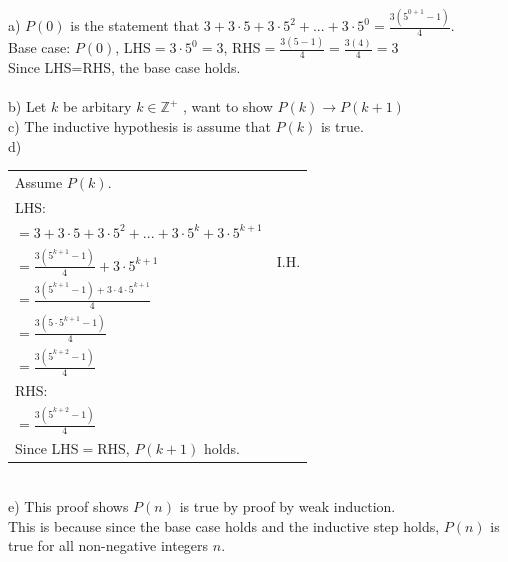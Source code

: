 \documentclass[12pt]{exam}
\begin{document}
\begin{solution}
	a) $P(0)$ is the statement that $3 + 3 \cdot 5 + 3 \cdot 5^2 + ... + 3 \cdot 5^0 = \frac{3 (5^{0+1} - 1)}{4}$.\\
	Base case: $P(0)$, LHS$=3 \cdot 5^0=3$, RHS$=\frac{3(5-1)}{4}=\frac{3(4)}{4}=3$\\
	Since LHS=RHS, the base case holds.\\
	\\ b) Let $k$ be arbitary $ k \in \mathbb{Z}^+$ , want to show $P(k) \rightarrow P(k+1)$\\
	c) The inductive hypothesis is assume that $P(k)$ is true.\\
	d)\\
	\begin{tabular}{ll}
		Assume $P(k)$.                                                       \\
		LHS:                                                                 \\
		$=3 + 3 \cdot 5 + 3 \cdot 5^2 + ... +3 \cdot 5^{k}+ 3 \cdot 5^{k+1}$ \\
		$=\frac{3 (5^{k+1} - 1)}{4}+3 \cdot 5^{k+1}$ & I.H.                  \\
		$=\frac{3(5^{k+1}-1)+ 3 \cdot 4 \cdot 5^{k+1}}{4}$                   \\
		$=\frac{3(5\cdot 5^{k+1}-1)}{4}$                                     \\
		$=\frac{3(5^{k+2}-1)}{4}$                                            \\
		RHS:                                                                 \\
		$=\frac{3(5^{k+2}-1)}{4}$                                            \\
		Since LHS$=$RHS, $P(k+1)$ holds.
	\end{tabular}
	\\e) This proof shows $P(n)$ is true by proof by weak induction.\\
	This is because since the base case holds and the inductive step holds, $P(n)$ is true for all non-negative integers $n$.
\end{solution}
\end{document}
